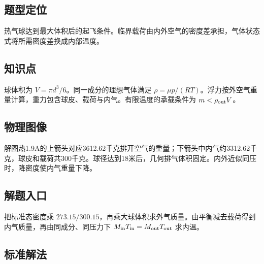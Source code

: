 \documentclass[UTF8,fontset=fandol,a4paper,11pt]{ctexart}
\begin{document}


\subsection*{题型定位}

热气球达到最大体积后的起飞条件。临界载荷由内外空气的密度差承担，气体状态式将所需密度差换成内部温度。



\subsection*{知识点}

球体积为 $V=\pi d^3/6$。同一成分的理想气体满足 $\rho=\mu p/(RT)$。浮力按外空气重量计算，重力包含球皮、载荷与内气。有限温度的承载条件为 $m<\rho_{\rm out}V$。



\subsection*{物理图像}

解图热1.9A的上箭头对应3612.62千克排开空气的重量；下箭头中内气约3312.62千克，球皮和载荷共300千克。球径达到18米后，几何排气体积固定。内外近似同压时，降密度使内气重量下降。



\subsection*{解题入口}

把标准态密度乘 $273.15/300.15$，再乘大球体积求外气质量。由平衡减去载荷得到内气质量，再由同成分、同压力下 $M_{\rm in}T_{\rm in}=M_{\rm out}T_{\rm out}$ 求内温。



\subsection*{标准解法}
\end{document}
